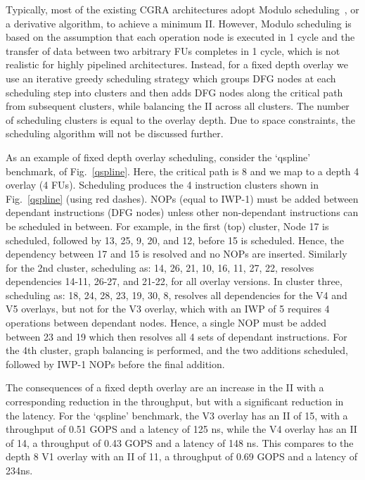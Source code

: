 Typically, most of the existing CGRA architectures adopt Modulo scheduling~\cite{rau1994iterative}, or a derivative algorithm, to achieve a minimum II. 
However, Modulo scheduling is based on the assumption that each operation node is executed in 1 cycle and the transfer of data between two arbitrary FUs completes in 1 cycle, which is not realistic for highly pipelined architectures. 
Instead, for a fixed depth overlay we use an iterative greedy scheduling strategy which groups DFG nodes at each scheduling step into clusters and then adds DFG nodes along the critical path from subsequent clusters, while balancing the II across all clusters.
The number of scheduling clusters is equal to the overlay depth.
Due to space constraints, the scheduling algorithm will not be discussed further.

As an example of fixed depth overlay scheduling, consider the `qspline' benchmark, of Fig.~\ref{qspline}. Here, the critical path is 8 and we map to a depth 4 overlay (4 FUs). Scheduling produces the 4 instruction clusters shown in Fig.~\ref{qspline} (using red dashes). NOPs (equal to IWP-1) must be added between dependant instructions (DFG nodes) unless other non-dependant instructions can be scheduled in between. For example, in the first (top) cluster, Node 17 is scheduled, followed by 13, 25, 9, 20, and 12, before 15 is scheduled. Hence, the dependency between 17 and 15 is resolved and no NOPs are inserted. 
Similarly for the 2nd cluster, scheduling as: 14, 26, 21, 10, 16, 11, 27, 22, resolves dependencies 14-11, 26-27, and 21-22, for all overlay versions. In cluster three, scheduling as: 18, 24, 28, 23, 19, 30, 8, resolves all dependencies for the V4 and V5 overlays, but not for the V3 overlay, which with an IWP of 5 requires 4 operations between dependant nodes. Hence, a single NOP must be added between 23 and 19 which then resolves all 4 sets of dependant instructions.
For the 4th cluster, graph balancing is performed, and the two additions scheduled, followed by IWP-1 NOPs before the final addition.


The consequences of a fixed depth overlay are an increase in the II with a corresponding reduction in the throughput, but with a significant reduction in the latency. For the `qspline' benchmark, the V3 overlay has an II of 15, with a throughput of 0.51 GOPS and a latency of 125 ns, while the V4 overlay has an II of 14, a throughput of 0.43 GOPS and a latency of 148 ns. This compares to the depth 8 V1 overlay with an II of 11, a throughput of 0.69 GOPS and a latency of 234ns. 




